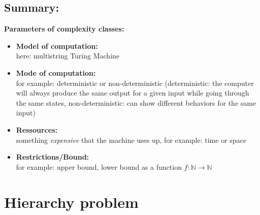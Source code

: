 \documentclass[a4]{scrartcl}
\begin{document}
\subsection*{Summary:}

\textbf{Parameters of complexity classes:}

\begin{itemize}
\item \textbf{Model of computation:} \\
here: multistring Turing Machine
\item \textbf{Mode of computation:} \\
for example: deterministic or non-deterministic (deterministic: the computer will always produce the same output for a given input while going through the same states, non-deterministic: can show different behaviors for the same input)
\item \textbf{Ressources:} \\ 
something \textit{expensive} that the machine uses up, for example: time or space
\item \textbf{Restrictions/Bound:} \\ 
for example: upper bound, lower bound as a function $f: \mathbb{N} \rightarrow \mathbb{N}$
\end{itemize}

















\section*{Hierarchy problem}



\newpage

\printbibliography
\end{document}

